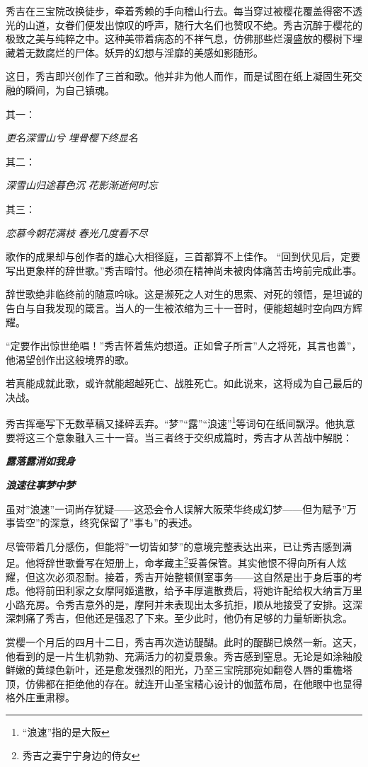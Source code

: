\documentclass[
]{article}
\begin{document}
秀吉在三宝院改换徒步，牵着秀赖的手向稽山行去。每当穿过被樱花覆盖得密不透光的山道，女眷们便发出惊叹的呼声，随行大名们也赞叹不绝。秀吉沉醉于樱花的极致之美与纯粹之中。这种美带着病态的不祥气息，仿佛那些烂漫盛放的樱树下埋藏着无数腐烂的尸体。妖异的幻想与淫靡的美感如影随形。

这日，秀吉即兴创作了三首和歌。他并非为他人而作，而是试图在纸上凝固生死交融的瞬间，为自己镇魂。

其一：

\emph{更名深雪山兮}
\emph{埋骨樱下终显名}

其二：

\emph{深雪山归途暮色沉}
\emph{花影渐逝何时忘}

其三：

\emph{恋慕今朝花满枝}
\emph{春光几度看不尽}

歌作的成果却与创作者的雄心大相径庭，三首都算不上佳作。
``回到伏见后，定要写出更象样的辞世歌。''秀吉暗忖。他必须在精神尚未被肉体痛苦击垮前完成此事。

辞世歌绝非临终前的随意吟咏。这是濒死之人对生的思索、对死的领悟，是坦诚的告白与自我发现的箴言。当人的一生被浓缩为三十一音时，便能超越时空向四方辉耀。

``定要作出惊世绝唱！''秀吉怀着焦灼想道。正如曾子所言''人之将死，其言也善''，他渴望创作出这般境界的歌。

若真能成就此歌，或许就能超越死亡、战胜死亡。如此说来，这将成为自己最后的决战。

秀吉挥毫写下无数草稿又揉碎丢弃。``梦''``露''``浪速''\footnote{``浪速''指的是大阪}等词句在纸间飘浮。他执意要将这三个意象融入三十一音。当三者终于交织成篇时，秀吉才从苦战中解脱：

\textbf{\emph{露落露消如我身}}

\textbf{\emph{浪速往事梦中梦}}

虽对''浪速''一词尚存犹疑------这恐会令人误解大阪荣华终成幻梦------但为赋予''万事皆空''的深意，终究保留了''事も''的表述。

尽管带着几分感伤，但能将''一切皆如梦''的意境完整表达出来，已让秀吉感到满足。他将辞世歌誊写在短册上，命孝藏主\footnote{秀吉之妻宁宁身边的侍女}妥善保管。其实他恨不得向所有人炫耀，但这次必须忍耐。接着，秀吉开始整顿侧室事务------这自然是出于身后事的考虑。他将前田利家之女摩阿姬遣散，给予丰厚遣散费后，将她许配给权大纳言万里小路充房。令秀吉意外的是，摩阿并未表现出太多抗拒，顺从地接受了安排。这深深刺痛了秀吉，但他还是强忍了下来。至少此时，他仍有足够的力量斩断执念。

赏樱一个月后的四月十二日，秀吉再次造访醍醐。此时的醍醐已焕然一新。这天，他看到的是一片生机勃勃、充满活力的初夏景象。秀吉感到窒息。无论是如涂釉般鲜嫩的黄绿色新叶，还是愈发强烈的阳光，乃至三宝院那宛如翻卷人唇的重檐塔顶，仿佛都在拒绝他的存在。就连开山圣宝精心设计的伽蓝布局，在他眼中也显得格外庄重肃穆。
\end{document}
